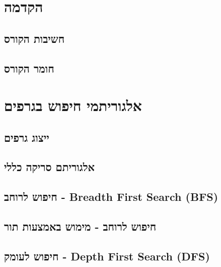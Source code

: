 \documentclass[]{article}
\def\insert#1{}
\begin{document}

\section*{הקדמה}
\insert{introduction}

	\subsection*{חשיבות הקורס}
	\insert{relevant}
	
	\subsection*{חומר הקורס}
	\insert{material}
	
\section*{אלגוריתמי חיפוש בגרפים}
	\insert{search}
	
	\subsection*{ייצוג גרפים}
	\insert{graph-representation}
	
	\subsection*{אלגוריתם סריקה כללי}
	\insert{general}
	
	\subsection*{חיפוש לרוחב - \textenglish{Breadth First Search (BFS)}}
	\insert{bfs}
	
	\subsection*{חיפוש לרוחב - מימוש באמצעות תור}
	\insert{bfs-q}
	
	\subsection*{חיפוש לעומק - \textenglish{Depth First Search (DFS)}}
	\insert{dfs}
\end{document}
